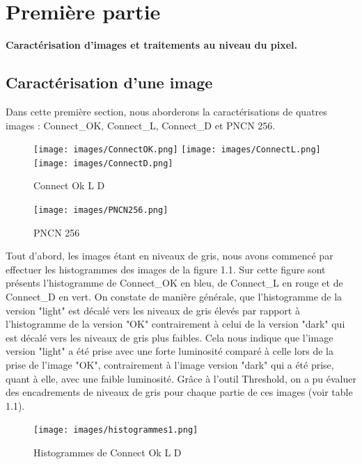 \documentclass{scrreprt}
\begin{document}
\tableofcontents

\chapter{Première partie}

\begin{center}
\large{
\textbf{Caractérisation d’images et traitements au niveau du pixel.}}
\end{center}

\section{Caractérisation d'une image}

Dans cette première section, nous aborderons la caractérisations de quatres images : Connect_OK, Connect_L,
Connect_D et PNCN 256. 	

\begin{center}
\begin{figure}[!h]
\texttt{[image: images/ConnectOK.png]}\hfill
\texttt{[image: images/ConnectL.png]}\hfill
\texttt{[image: images/ConnectD.png]}
\caption{Connect Ok L D }
\end{figure}
\begin{figure}[!h]
\centering
\texttt{[image: images/PNCN256.png]}
\caption{PNCN 256}
\end{figure}
\end{center}

\newpage
Tout d'abord, les images étant en niveaux de gris, nous avons commencé par effectuer les histogrammes des images de la figure 1.1. 
Sur cette figure sont présents l'histogramme de Connect_OK en bleu, de Connect_L en rouge et de Connect_D en vert. 
On constate de manière générale, que l'histogramme de la version "light" est décalé vers les niveaux de gris élevés par rapport
à l'histogramme de la version "OK" contrairement à celui de la version "dark" qui est décalé vers les niveaux de gris plus faibles.
Cela nous indique que l'image version "light" a été prise avec une forte luminosité comparé à celle lors de la prise de l'image "OK", 
contrairement à l'image version "dark" qui a été prise, quant à elle, avec une faible luminosité.
Grâce à l'outil Threshold, on a pu évaluer des encadrements de niveaux de gris pour chaque partie de ces images (voir table 1.1).
 
\begin{figure}[!h]
\centering
\texttt{[image: images/histogrammes1.png]}
\caption{Histogrammes de Connect Ok L D}
\end{figure}
\end{document}
